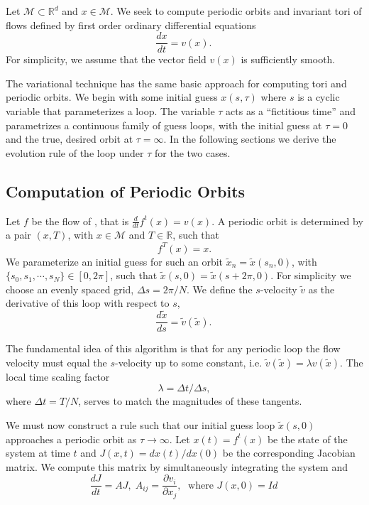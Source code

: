 \documentclass[aip,cha,reprint,
secnumarabic,
nofootinbib, tightenlines,
nobibnotes, showkeys, showpacs,
groupedaddress
]{revtex4-1}
\begin{document}
Let $\mathcal{M} \subset \mathbb{R}^d$ and $ x \in \mathcal{M}$.  We seek to compute periodic orbits and invariant tori of flows defined by first order ordinary differential equations
\begin{equation}
 \frac{d x}{dt}= v( x).
\,
\label{ODEs}
\end{equation}
For simplicity, we assume that the vector field $ v( x)$ is sufficiently smooth.

The variational technique has the same basic approach for computing tori
and periodic orbits.  We begin with some initial guess $ x(s,\tau)$ where
$s$ is a cyclic variable that parameterizes a loop.  The variable
$\tau$ acts as a ``fictitious time'' and parametrizes a continuous family
of  guess loops, with the initial guess at $\tau=0$ and the true, desired
orbit at $\tau=\infty$.  In the following sections we derive the
evolution rule of the loop under $\tau$ for the two cases.

\subsection{Computation of Periodic Orbits}

Let $f$ be the flow of , that is $ \frac{d}{dt}f^{t}(x)=v(x)$. A periodic orbit is determined by a pair $(x,T)$, with $ x \in
\mathcal{M}$ and $T \in \mathbb{R}$, such that
\[
 f^T( x)= x.
 \]
We parameterize an initial guess for such an orbit
$\tilde{x}_n=\tilde{x}(s_n,0)$, with $\{s_0,s_1,\cdots,s_N\}\in[0,2\pi]$,
such that $\tilde{x}(s,0)=\tilde{x}(s+2\pi,0)$.  For simplicity we choose an
evenly spaced grid, $\Delta s=2\pi/N$.  We define the $s$-velocity
$\tilde{v}$ as the derivative of this loop with respect to $s$,
\begin{equation}
 \frac{d \tilde{x}}{ds}=\tilde{v}( \tilde{x}).
\,
\label{Svel}
\end{equation}

The fundamental idea of this algorithm is that for any periodic loop the
flow velocity must equal the $s$-velocity up to some constant, i.e.
$\tilde{v}( \tilde{x})=\lambda  {v}(\tilde{x})$. The local time scaling
factor
\begin{equation}
\lambda=\Delta t / \Delta s,
\label{lam}
\end{equation}
where $\Delta t = T/N$, serves to match the magnitudes of these tangents.

We must now construct a rule such that our initial guess loop
$\tilde{x}(s,0)$ approaches a periodic orbit as $\tau \to \infty$.  Let
$x(t)=f^t(x)$ be the state of the system at time $t$ and
$J(x,t)=dx(t)/dx(0)$ be the corresponding Jacobian matrix.  We compute
this matrix by simultaneously integrating the system  and
\begin{equation}
\frac{dJ}{dt}=AJ, \; A_{ij}=\frac{\partial v_i}{\partial x_j}, \; \mbox{ where } J(x,0)=Id\,
\label{Jacobian}
\end{equation}
\end{document}
